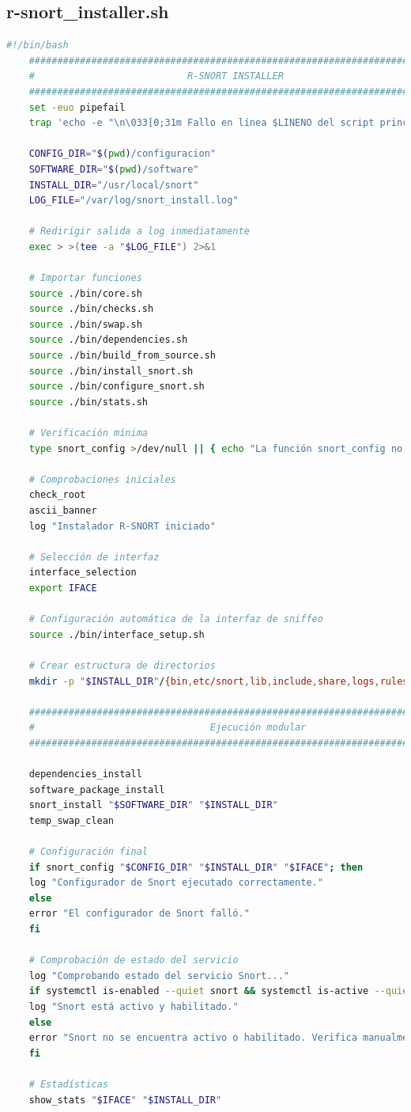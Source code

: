 \documentclass[11pt,a4paper,twoside]{report}
\begin{document}
\subsection*{r-snort\_installer.sh}
\begin{lstlisting}[language=bash, caption={r-snort\_installer.sh}, label={lst:r-snort-installer}]
	#!/bin/bash
	###############################################################################
	#                           R-SNORT INSTALLER                                 #
	###############################################################################
	set -euo pipefail
	trap 'echo -e "\n\033[0;31m Fallo en línea $LINENO del script principal\033[0m"' ERR
	
	CONFIG_DIR="$(pwd)/configuracion"
	SOFTWARE_DIR="$(pwd)/software"
	INSTALL_DIR="/usr/local/snort"
	LOG_FILE="/var/log/snort_install.log"
	
	# Redirigir salida a log inmediatamente
	exec > >(tee -a "$LOG_FILE") 2>&1
	
	# Importar funciones
	source ./bin/core.sh
	source ./bin/checks.sh
	source ./bin/swap.sh
	source ./bin/dependencies.sh
	source ./bin/build_from_source.sh
	source ./bin/install_snort.sh
	source ./bin/configure_snort.sh
	source ./bin/stats.sh
	
	# Verificación mínima
	type snort_config >/dev/null || { echo "La función snort_config no está disponible"; exit 1; }
	
	# Comprobaciones iniciales
	check_root
	ascii_banner
	log "Instalador R-SNORT iniciado"
	
	# Selección de interfaz
	interface_selection
	export IFACE
	
	# Configuración automática de la interfaz de sniffeo
	source ./bin/interface_setup.sh
	
	# Crear estructura de directorios
	mkdir -p "$INSTALL_DIR"/{bin,etc/snort,lib,include,share,logs,rules}
	
	###############################################################################
	#                               Ejecución modular                             #
	###############################################################################
	
	dependencies_install
	software_package_install
	snort_install "$SOFTWARE_DIR" "$INSTALL_DIR"
	temp_swap_clean
	
	# Configuración final
	if snort_config "$CONFIG_DIR" "$INSTALL_DIR" "$IFACE"; then
	log "Configurador de Snort ejecutado correctamente."
	else
	error "El configurador de Snort falló."
	fi
	
	# Comprobación de estado del servicio
	log "Comprobando estado del servicio Snort..."
	if systemctl is-enabled --quiet snort && systemctl is-active --quiet snort; then
	log "Snort está activo y habilitado."
	else
	error "Snort no se encuentra activo o habilitado. Verifica manualmente con: systemctl status snort"
	fi
	
	# Estadísticas
	show_stats "$IFACE" "$INSTALL_DIR"
\end{lstlisting}
\end{document}
